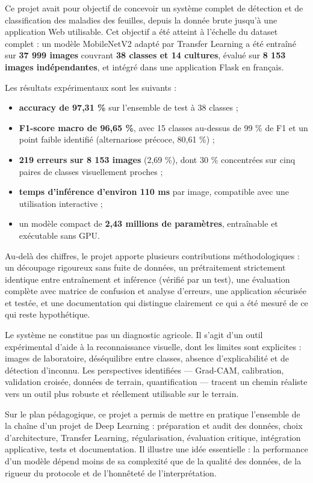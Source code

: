 \documentclass[10pt,a4paper]{article}
\begin{document}
Ce projet avait pour objectif de concevoir un système complet de détection et de classification des maladies des feuilles, depuis la donnée brute jusqu'à une application Web utilisable. Cet objectif a été atteint à l'échelle du dataset complet : un modèle MobileNetV2 adapté par Transfer Learning a été entraîné sur \textbf{37 999 images} couvrant \textbf{38 classes et 14 cultures}, évalué sur \textbf{8 153 images indépendantes}, et intégré dans une application Flask en français.

Les résultats expérimentaux sont les suivants :

\begin{itemize}
\item \textbf{accuracy de 97,31 \%} sur l'ensemble de test à 38 classes ;
\item \textbf{F1-score macro de 96,65 \%}, avec 15 classes au-dessus de 99 \% de F1 et un point faible identifié (alternariose précoce, 80,61 \%) ;
\item \textbf{219 erreurs sur 8 153 images} (2,69 \%), dont 30 \% concentrées sur cinq paires de classes visuellement proches ;
\item \textbf{temps d'inférence d'environ 110 ms} par image, compatible avec une utilisation interactive ;
\item un modèle compact de \textbf{2,43 millions de paramètres}, entraînable et exécutable sans GPU.
\end{itemize}

Au-delà des chiffres, le projet apporte plusieurs contributions méthodologiques : un découpage rigoureux sans fuite de données, un prétraitement strictement identique entre entraînement et inférence (vérifié par un test), une évaluation complète avec matrice de confusion et analyse d'erreurs, une application sécurisée et testée, et une documentation qui distingue clairement ce qui a été mesuré de ce qui reste hypothétique.

Le système ne constitue pas un diagnostic agricole. Il s'agit d'un outil expérimental d'aide à la reconnaissance visuelle, dont les limites sont explicites : images de laboratoire, déséquilibre entre classes, absence d'explicabilité et de détection d'inconnu. Les perspectives identifiées --- Grad-CAM, calibration, validation croisée, données de terrain, quantification --- tracent un chemin réaliste vers un outil plus robuste et réellement utilisable sur le terrain.

Sur le plan pédagogique, ce projet a permis de mettre en pratique l'ensemble de la chaîne d'un projet de Deep Learning : préparation et audit des données, choix d'architecture, Transfer Learning, régularisation, évaluation critique, intégration applicative, tests et documentation. Il illustre une idée essentielle : la performance d'un modèle dépend moins de sa complexité que de la qualité des données, de la rigueur du protocole et de l'honnêteté de l'interprétation.
\end{document}
